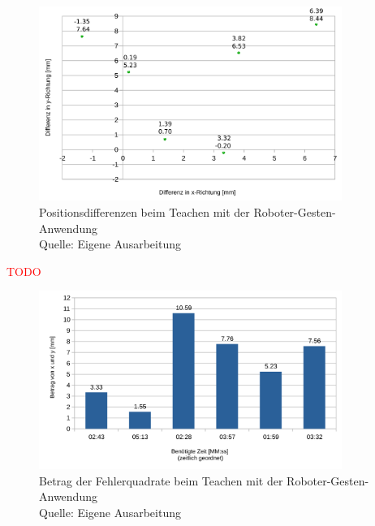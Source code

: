 

\begin{figure}[htb]
	\centering
	\includegraphics[width=0.88\textwidth]{images/ergebnisse/Differenzen_beim_Teachen_mit_Gesten}
	\caption[Positionsdifferenzen beim Teachen mit der Roboter-Gesten-Anwendung]{Positionsdifferenzen beim Teachen mit der Roboter-Gesten-Anwendung\\Quelle: Eigene Ausarbeitung}
	\label{fig:measurement_teaching_positions}
\end{figure}
\FloatBarrier

\textcolor{red}{TODO}

\begin{figure}[htb]
	\centering
	\includegraphics[width=0.88\textwidth]{images/ergebnisse/Betrag_der_Fehlerquadrate}
	\caption[Betrag der Fehlerquadrate beim Teachen mit der Roboter-Gesten-Anwendung]{Betrag der Fehlerquadrate beim Teachen mit der Roboter-Gesten-Anwendung\\Quelle: Eigene Ausarbeitung}
	\label{fig:measurement_teaching_positions}
\end{figure}
\FloatBarrier

